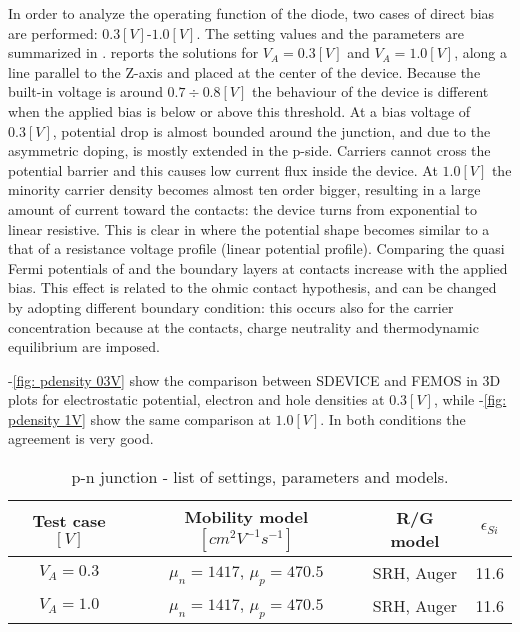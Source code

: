 In order to analyze the operating function of the diode, two cases of direct bias are performed: $0.3[V]$-$1.0[V]$. The setting values and the parameters are summarized in . 
 reports the solutions for $V_A=0.3[V]$ and $V_A=1.0[V]$, along a line parallel to the Z-axis and placed at the center of the device. 
Because the built-in voltage is around $0.7 \div 0.8 [V]$ the behaviour of the device is different when the applied bias is below or above this threshold. 
At a bias voltage of $0.3[V]$, potential drop is almost bounded around the junction, and due to the asymmetric doping, is mostly extended in the p-side. Carriers cannot cross the potential barrier and this causes low current flux inside the device.
At $1.0[V]$ the minority carrier density becomes almost ten order bigger, resulting in a large amount of current toward the contacts:  the device turns from exponential to linear resistive. This is clear in  where the potential shape becomes similar to a that of a resistance voltage profile (linear potential profile). Comparing the quasi Fermi potentials of  and  the boundary layers at contacts increase with the applied bias. This effect is related to the ohmic contact hypothesis, and can be changed by adopting different boundary condition: this occurs also for the carrier concentration because at the contacts, charge neutrality and thermodynamic equilibrium  are imposed.

-\ref{fig: pdensity 03V} show the comparison between SDEVICE and FEMOS in 3D plots for electrostatic potential, electron and hole densities at $0.3[V]$, while -\ref{fig: pdensity 1V} show the same comparison at $1.0[V]$. In both conditions the agreement is very good.

\begin{table}[!h]
\centering
\begin{tabular}{cccc}
\toprule
 Test case $[V]$  & Mobility model $[cm^2V^{-1}s^{-1}]$  & R/G model & $\epsilon_{Si}$\\
\midrule
$V_A=0.3$ & $\mu_n = 1417$, $\mu_p = 470.5$ & SRH, Auger & 11.6 \\
$V_A=1.0$ & $\mu_n = 1417$, $\mu_p = 470.5$ & SRH, Auger & 11.6 \\\bottomrule
\end{tabular}
\caption{p-n junction - list of settings, parameters and models.}
\label{tab: diode direct}
\end{table}


